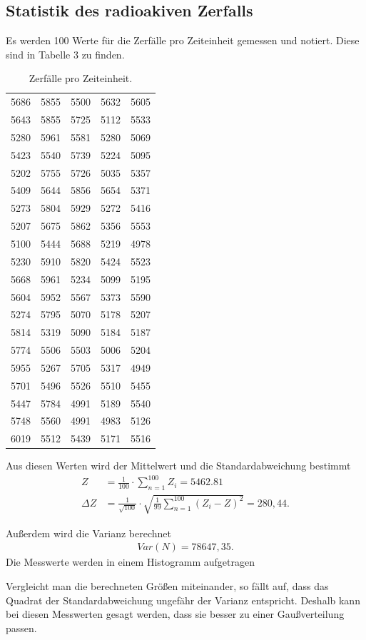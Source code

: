 \subsection{Statistik des radioakiven Zerfalls}

Es werden 100 Werte für die Zerfälle pro Zeiteinheit gemessen und notiert. Diese sind in Tabelle 3 zu finden.
\begin{table}[H]
  \centering
  \caption{Zerfälle pro Zeiteinheit.}
  \label{tab:Parameter}
  \begin{tabular}{c c c c c}
    \bottomrule
     5686&5855 &5500&5632&5605 \\
     5643&5855 &5725   &5112&5533 \\
     5280&5961  &5581  &5280&5069 \\
     5423&5540  &5739  &5224 &5095 \\
     5202&5755  &5726  &5035 &5357 \\
     5409&5644  &5856  &5654   &5371 \\
     5273&5804  &5929  &5272     &5416 \\
     5207&5675  &5862  &5356     &5553 \\
     5100&5444  &5688  &5219     &4978 \\
     5230&5910  &5820  &5424     &5523 \\
     5668&5961  &5234  &5099     &5195 \\
     5604&5952  &5567  &5373     &5590 \\
     5274&5795  &5070  &5178     &5207 \\
     5814&5319  &5090  &5184     &5187 \\
     5774&5506  &5503  &5006     &5204 \\
     5955&5267  &5705  &5317     &4949 \\
     5701&5496  &5526  &5510 &5455 \\
     5447&5784  &4991  &5189     &5540 \\
     5748&5560  &4991  &4983     &5126 \\
     6019&5512  &5439  &5171     &5516 \\
  \bottomrule
  \end{tabular}
\end{table}

\noindent Aus diesen Werten wird der Mittelwert und die Standardabweichung bestimmt
\begin{align*}
Z &= \frac{1}{100}\cdot \sum_{n=1}^{100} Z_i = 5462.81 \\
\Delta Z &=\frac{1}{\sqrt{100}} \cdot \sqrt{\frac{1}{99} \sum_{n=1}^{100} (Z_i - Z)^2} = 280,44.
\end{align*}

\noindent Außerdem wird die Varianz berechnet
\begin{align*}
Var(N) = 78647,35 .
\end{align*}
Die Messwerte werden in einem Histogramm aufgetragen

\noindent Vergleicht man die berechneten Größen miteinander, so fällt auf, dass
das Quadrat der Standardabweichung ungefähr der Varianz entspricht. Deshalb kann bei diesen Messwerten gesagt werden, dass sie besser zu einer Gaußverteilung passen.

